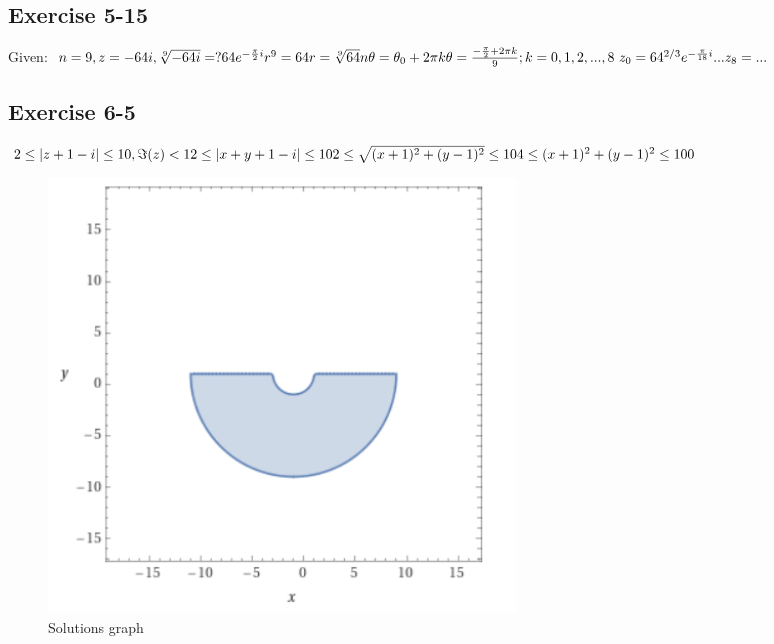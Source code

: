 \documentclass{article}
\begin{document}
        \subsection*{Exercise 5-15}
            Given: 
            \begin{math}
                n=9,z=-64i,\sqrt[9]{-64i}=?\\
                64e^{-\frac{\pi}{2}i}\\
                r^9=64\\
                r=\sqrt[9]{64}\\
                n\theta=\theta_{0}+2\pi k\\
                \theta=\frac{-\frac{\pi}{2}+2\pi k}{9}; k=0,1,2,...,8\\\
                z_{0}=64^{2/3}e^{-\frac{\pi}{18}i}\\
                ...\\
                z_{8}=...
            \end{math}

            
        \subsection*{Exercise 6-5}
            \begin{math}
                2 \leq |z+1-i| \leq 10, \Im(z) < 1\\
                2 \leq |x+y+1-i| \leq 10\\
                2 \leq \sqrt{(x+1)^2+(y-1)^2} \leq 10\\
                4 \leq (x+1)^2+(y-1)^2 \leq 100\\
            \end{math}
            \begin{figure}[H]
                \centering
                \includegraphics[width=0.6\textwidth]{graph.png}
                \caption{Solutions graph}
                \label{fig:solutions-graph}
            \end{figure}
    \newpage
    
\end{document}
